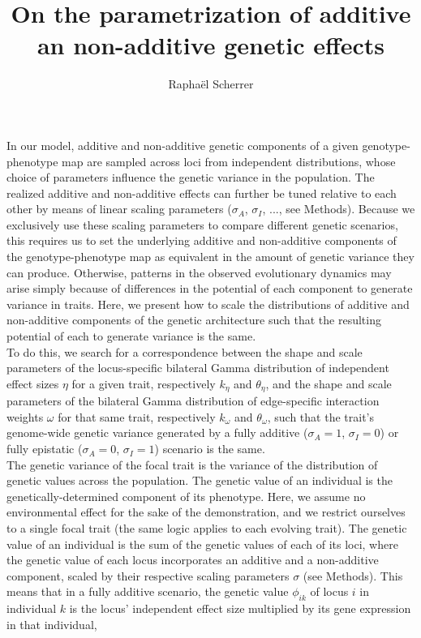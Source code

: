 \documentclass[]{article}
\title{On the parametrization of additive an non-additive genetic effects}
\author{Rapha\"{e}l Scherrer}
\begin{document}
\maketitle

In our model, additive and non-additive genetic components of a given genotype-phenotype map are sampled across loci from independent distributions, whose choice of parameters influence the genetic variance in the population. The realized additive and non-additive effects can further be tuned relative to each other by means of linear scaling parameters ($\sigma_A$, $\sigma_I$, ..., see Methods). Because we exclusively use these scaling parameters to compare different genetic scenarios, this requires us to set the underlying additive and non-additive components of the genotype-phenotype map as equivalent in the amount of genetic variance they can produce. Otherwise, patterns in the observed evolutionary dynamics may arise simply because of differences in the potential of each component to generate variance in traits. Here, we present how to scale the distributions of additive and non-additive components of the genetic architecture such that the resulting potential of each to generate variance is the same.\\

To do this, we search for a correspondence between the shape and scale parameters of the locus-specific bilateral Gamma distribution of independent effect sizes $\eta$ for a given trait, respectively $k_{\eta}$ and $\theta_{\eta}$, and the shape and scale parameters of the bilateral Gamma distribution of edge-specific interaction weights $\omega$ for that same trait, respectively $k_{\omega}$ and $\theta_{\omega}$, such that the trait's genome-wide genetic variance generated by a fully additive ($\sigma_A = 1$, $\sigma_I = 0$) or fully epistatic ($\sigma_A = 0$, $\sigma_I = 1$) scenario is the same.\\

The genetic variance of the focal trait is the variance of the distribution of genetic values across the population. The genetic value of an individual is the genetically-determined component of its phenotype. Here, we assume no environmental effect for the sake of the demonstration, and we restrict ourselves to a single focal trait (the same logic applies to each evolving trait). The genetic value of an individual is the sum of the genetic values of each of its loci, where the genetic value of each locus incorporates an additive and a non-additive component, scaled by their respective scaling parameters $\sigma$ (see Methods). This means that in a fully additive scenario, the genetic value $\phi_{ik}$ of locus $i$ in individual $k$ is the locus' independent effect size multiplied by its gene expression in that individual,
\end{document}
